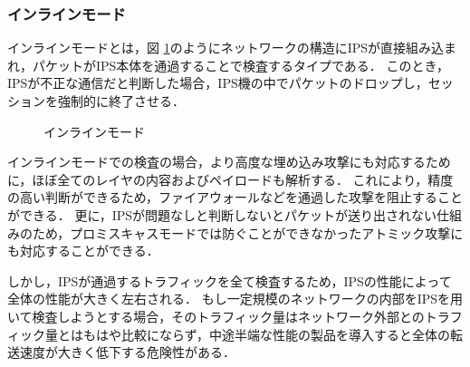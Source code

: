 \subsubsection{インラインモード}

インラインモードとは，図 \ref{fig:2-2}のようにネットワークの構造にIPSが直接組み込まれ，パケットがIPS本体を通過することで検査するタイプである\cite{ciscoips}．
このとき，IPSが不正な通信だと判断した場合，IPS機の中でパケットのドロップし，セッションを強制的に終了させる．

\begin{figure}[tb]
	\begin{center}
		\caption{インラインモード}
		\label{fig:2-2}
	\end{center}
\end{figure}

インラインモードでの検査の場合，より高度な埋め込み攻撃にも対応するために，ほぼ全てのレイヤの内容およびペイロードも解析する．
これにより，精度の高い判断ができるため，ファイアウォールなどを通過した攻撃を阻止することができる．
更に，IPSが問題なしと判断しないとパケットが送り出されない仕組みのため，プロミスキャスモードでは防ぐことができなかったアトミック攻撃にも対応することができる．

しかし，IPSが通過するトラフィックを全て検査するため，IPSの性能によって全体の性能が大きく左右される．
もし一定規模のネットワークの内部をIPSを用いて検査しようとする場合，そのトラフィック量はネットワーク外部とのトラフィック量とはもはや比較にならず，中途半端な性能の製品を導入すると全体の転送速度が大きく低下する危険性がある．